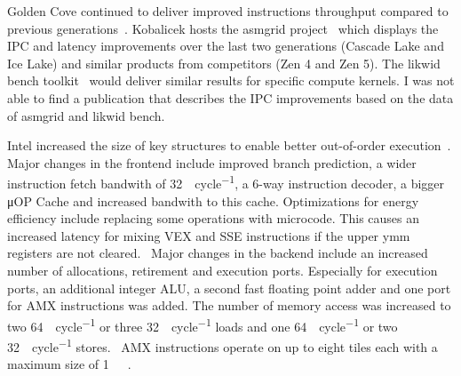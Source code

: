 Golden Cove continued to deliver improved instructions throughput compared to previous generations~\cite{Intel_2021_Architecture_Day}.
Kobalicek hosts the asmgrid project~\cite{Kobalicek_AsmGrid} which displays the IPC and latency improvements over the last two generations (Cascade Lake and Ice Lake) and similar products from competitors (Zen 4 and Zen 5).
The likwid bench toolkit~\cite{RHZE_HPC_likwid} would deliver similar results for specific compute kernels.
I was not able to find a publication that describes the IPC improvements based on the data of asmgrid and likwid bench.

Intel increased the size of key structures to enable better out-of-order execution~\cite[Sec. 2.4]{Intel_Optimization_Reference_Manual_050}.
Major changes in the frontend include improved branch prediction, a wider instruction fetch bandwith of \SI{32}{\byte\per cycle}, a 6-way instruction decoder, a bigger μOP Cache and increased bandwith to this cache.
Optimizations for energy efficiency include replacing some operations with microcode.
This causes an increased latency for mixing VEX and SSE instructions if the upper ymm registers are not cleared.~\cite[Sec. 3.11.6]{Intel_Optimization_Reference_Manual_050}
Major changes in the backend include an increased number of allocations, retirement and execution ports.
Especially for execution ports, an additional integer ALU, a second fast floating point adder and one port for AMX instructions was added.
The number of memory access was increased to two \SI{64}{\byte\per cycle} or three \SI{32}{\byte\per cycle} loads and one \SI{64}{\byte\per cycle} or two \SI{32}{\byte\per cycle} stores.~\cite[Sec. 2.4]{Intel_Optimization_Reference_Manual_050}
AMX instructions operate on up to eight tiles each with a maximum size of \SI{1}{\kibi\byte}~\cite[Sec. 20.5.2]{Intel_Optimization_Reference_Manual_050}.

